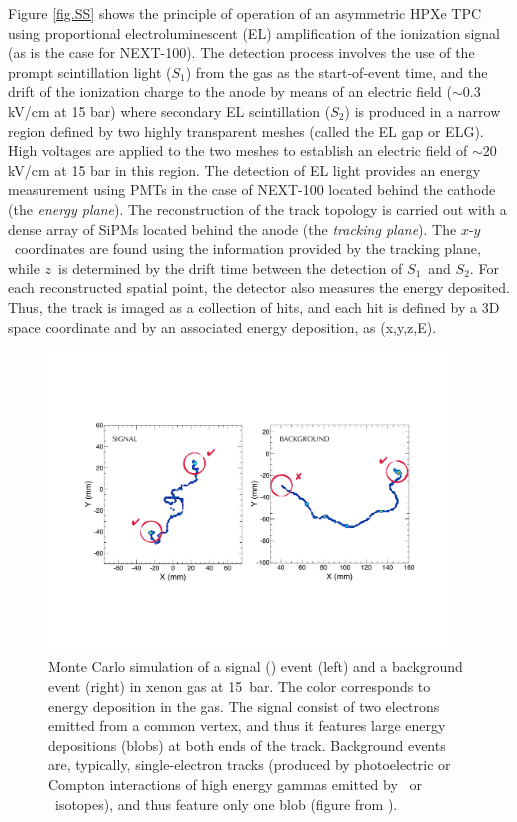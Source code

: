 \documentclass[a4paper,11pt]{article}
\begin{document}
Figure \ref{fig.SS} shows the principle of operation of an asymmetric HPXe TPC using proportional electroluminescent (EL) amplification of the ionization signal (as is the case for NEXT-100). The detection process involves the use of the prompt scintillation light ($S_1$) from the gas as the start-of-event time, and the drift of the ionization charge to the anode by means of an electric field ($\sim0.3$ kV/cm at 15 bar) where secondary EL scintillation ($S_2$) is produced in a narrow region defined by two highly transparent meshes (called the EL gap or ELG).  High voltages are applied to the two meshes to establish an electric field of $\sim 20$ kV/cm at 15 bar in this region. The detection of EL light provides an energy measurement using PMTs in the case of NEXT-100 located behind the cathode (the \emph{energy plane}). The reconstruction of the track topology is carried out with a dense array of SiPMs located behind the anode (the \emph{tracking plane}). The $x$-$y$~coordinates are found using the information provided by the tracking plane, while $z$~is determined by the drift time between the detection of $S_1$~and $S_2$. For each reconstructed spatial point, the detector also measures the energy deposited. Thus, the track is imaged as a collection of hits, and each hit is defined by a 3D space coordinate and by an associated energy deposition, as (x,y,z,E).

\begin{figure}[!htb]
\centering
\includegraphics[width= 0.95\textwidth]{fig/TrackSignature.pdf}
\caption{Monte Carlo simulation of a signal (\bbonu) event (left) and a  background event (right) in xenon gas at 15~bar. The color corresponds to energy deposition in the gas. The signal consist of two electrons emitted from a common vertex, and thus it features large energy depositions  (blobs) at both ends of the track. Background events are, typically, single-electron tracks (produced by photoelectric or Compton interactions of high energy gammas emitted by \BI\ or \TL\ isotopes), and thus feature only one blob (figure from \cite{MartinAlbo_thesis}).} \label{fig.ETRK2}
\end{figure}
\end{document}
